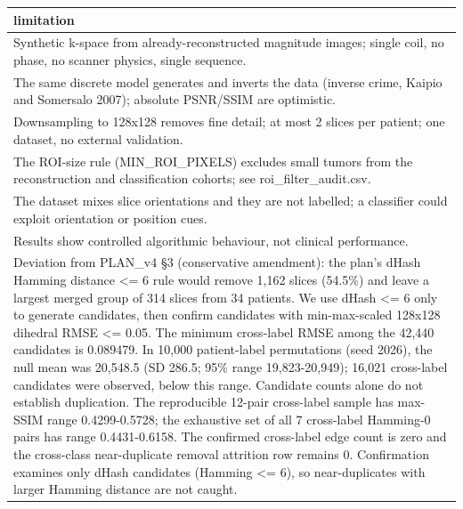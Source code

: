 \begin{tabular}{l}
\hline
limitation \\
\hline
Synthetic k-space from already-reconstructed magnitude images; single coil, no phase, no scanner physics, single sequence. \\
The same discrete model generates and inverts the data (inverse crime, Kaipio and Somersalo 2007); absolute PSNR/SSIM are optimistic. \\
Downsampling to 128x128 removes fine detail; at most 2 slices per patient; one dataset, no external validation. \\
The ROI-size rule (MIN\_ROI\_PIXELS) excludes small tumors from the reconstruction and classification cohorts; see roi\_filter\_audit.csv. \\
The dataset mixes slice orientations and they are not labelled; a classifier could exploit orientation or position cues. \\
Results show controlled algorithmic behaviour, not clinical performance. \\
Deviation from PLAN\_v4 §3 (conservative amendment): the plan's dHash Hamming distance <= 6 rule would remove 1,162 slices (54.5\%) and leave a largest merged group of 314 slices from 34 patients. We use dHash <= 6 only to generate candidates, then confirm candidates with min-max-scaled 128x128 dihedral RMSE <= 0.05. The minimum cross-label RMSE among the 42,440 candidates is 0.089479. In 10,000 patient-label permutations (seed 2026), the null mean was 20,548.5 (SD 286.5; 95\% range 19,823-20,949); 16,021 cross-label candidates were observed, below this range. Candidate counts alone do not establish duplication. The reproducible 12-pair cross-label sample has max-SSIM range 0.4299-0.5728; the exhaustive set of all 7 cross-label Hamming-0 pairs has range 0.4431-0.6158. The confirmed cross-label edge count is zero and the cross-class near-duplicate removal attrition row remains 0. Confirmation examines only dHash candidates (Hamming <= 6), so near-duplicates with larger Hamming distance are not caught. \\
\hline
\end{tabular}
